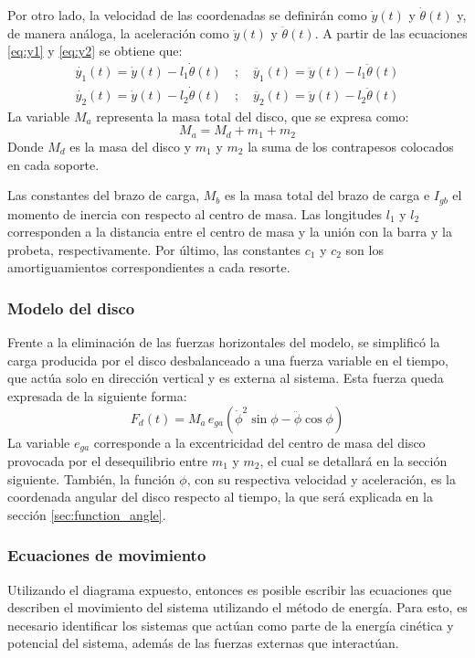 Por otro lado, la velocidad de las coordenadas se definirán como $\dot{y}(t)$ y $\dot{\theta}(t)$ y, de manera análoga, la aceleración como $\ddot{y}(t)$ y $\ddot{\theta}(t)$. A partir de las ecuaciones \ref{eq:y1} y \ref{eq:y2} se obtiene que:
\begin{gather}
	\dot{y_1}(t) = \dot{y}(t) - l_1\dot{\theta}(t) \quad ;\quad \ddot{y_1}(t) = \ddot{y}(t) - l_1\ddot{\theta}(t) \\
 	\dot{y_2}(t) = \dot{y}(t) - l_2\dot{\theta}(t) \quad ;\quad \ddot{y_2}(t) = \ddot{y}(t) - l_2\ddot{\theta}(t) 
\end{gather}
La variable $M_a$ representa la masa total del disco, que se expresa como:
\begin{equation}\label{eq:m_a}
	M_a = M_d + m_1 + m_2
\end{equation}
Donde $M_d$ es la masa del disco y $m_1$ y $m_2$ la suma de los contrapesos colocados en cada soporte. 

Las constantes del brazo de carga, $M_b$ es la masa total del brazo de carga e $I_{gb}$ el momento de inercia con respecto al centro de masa. Las longitudes $l_1$ y $l_2$ corresponden a la distancia entre el centro de masa y la unión con la barra y la probeta, respectivamente. Por último, las constantes $c_1$ y $c_2$ son los amortiguamientos correspondientes a cada resorte.


\subsubsection{Modelo del disco}
Frente a la eliminación de las fuerzas horizontales del modelo, se simplificó la carga producida por el disco desbalanceado a una fuerza variable en el tiempo, que actúa solo en dirección vertical y es externa al sistema. Esta fuerza queda expresada de la siguiente forma:
\begin{equation}\label{eq:fza_gen}
	F_d(t) = M_a\, e_{ga}(\dot{\phi}^2 \sin\phi - \ddot{\phi} \cos\phi)
\end{equation}
La variable $e_{ga}$ corresponde a la excentricidad del centro de masa del disco provocada por el desequilibrio entre $m_1$ y $m_2$, el cual se detallará en la sección siguiente. También, la función $\phi$, con su respectiva velocidad y aceleración, es la coordenada angular del disco respecto al tiempo, la que será explicada en la sección \ref{sec:function_angle}.

\subsubsection{Ecuaciones de movimiento}
Utilizando el diagrama expuesto, entonces es posible escribir las ecuaciones que describen el movimiento del sistema utilizando el método de energía. Para esto, es necesario identificar los sistemas que actúan como parte de la energía cinética y potencial del sistema, además de las fuerzas externas que interactúan.

